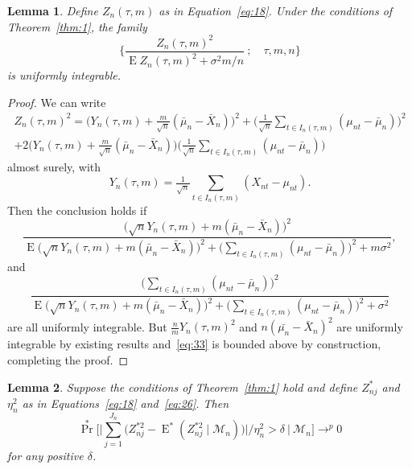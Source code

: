 \documentclass[11pt]{article}
\newtheorem{lem}{Lemma}
\theoremstyle{definition}
\DeclareMathOperator{\E}{E}
\DeclareMathOperator{\pr}{Pr}
\begin{document}
\begin{lem}\label{res:L}
  Define $Z_n(\tau,m)$ as in Equation~\eqref{eq:18}.  Under the
  conditions of Theorem~\ref{thm:1}, the family
  \begin{equation*}
    \Bigg\{\frac{Z_{n}(\tau,m)^2}{\E
  Z_n(\tau,m)^2 + \sigma^2 m / n}\ ;\quad \tau, m, n\Bigg\}
  \end{equation*}
 is uniformly integrable.
\end{lem}
\begin{proof}
  We can write 
  \begin{multline}\label{eq:35}
    Z_n(\tau, m)^2 = \big(Y_n(\tau, m) + \tfrac{m}{\sqrt{n}}
    (\bar{\mu}_n - \bar{X}_n) \big)^2 + \Big(\tfrac{1}{\sqrt{n}}\sum_{t \in I_n(\tau,m)} (\mu_{nt} - \bar{\mu}_n)\Big)^2\\
    + 2 \big(Y_n(\tau, m) + \tfrac{m}{\sqrt{n}} (\bar{\mu}_n - \bar{X}_n)\big)
    \Big(\tfrac{1}{\sqrt{n}}\sum_{t \in I_n(\tau,m)} (\mu_{nt} - \bar{\mu}_n)\Big)
  \end{multline}
  almost surely, with 
  \begin{equation}\label{eq:28}
    Y_n(\tau, m) = \tfrac{1}{\sqrt{n}} \sum_{t \in
      I_n(\tau, m)} (X_{nt} - \mu_{nt}).
  \end{equation}
  Then the conclusion holds if
  \begin{equation}\label{eq:34}
    \frac{\big(\sqrt{n} Y_n(\tau, m) + m (\bar{\mu}_n - \bar{X}_n) \big)^2}
    {\E \big(\sqrt{n} Y_n(\tau,m) + m (\bar{\mu}_n - \bar{X}_n)\big)^2  
    + \big(\sum_{t \in I_n(\tau,m)} (\mu_{nt} - \bar{\mu}_n)\big)^2 + m \sigma^2},
  \end{equation}
  and
  \begin{equation}\label{eq:33}
    \frac{\big(\sum_{t \in I_n(\tau,m)} (\mu_{nt} - \bar{\mu}_n)\big)^2}
    {\E \big(\sqrt{n} Y_n(\tau,m) + m (\bar{\mu}_n - \bar{X}_n) \big)^2  +\big(\sum_{t \in I_n(\tau,m)} (\mu_{nt} - \bar{\mu}_n)\big)^2 + \sigma^2}
  \end{equation}
  are all uniformly integrable.  But $\tfrac{n}{m} Y_n(\tau, m)^2$ and
  $n (\bar{\mu_n} - \bar X_n)^2$ are uniformly integrable by existing
  results \citep{Dav:92,Dav:93,Jon:97} and~\eqref{eq:33} is bounded
  above by construction, completing the proof.
\end{proof}

\begin{lem}\label{res:H}
  Suppose the conditions of Theorem~\ref{thm:1} hold and define
  $Z_{nj}^{*}$ and $\eta_n^2$ as in Equations~\eqref{eq:18}
  and~\eqref{eq:26}. Then
  \begin{equation}
    \label{eq:2}
    \pr^{*}\Big[\Big| \sum_{j=1}^{J_n} \big(Z_{nj}^{*2} -
    \E^{*}(Z_{nj}^{*2} \mid \mathcal{M}_n)\big) \Big| \Big/ \eta_n^2
    > \delta \ \Big|\ \mathcal{M}_n \Big] \to^p 0
  \end{equation}
  for any positive $\delta$.
\end{lem}
\end{document}
